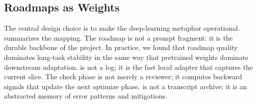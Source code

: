 \begin{table}[t]
\centering
\small
{}
\caption{The eight loop skills share the same persistent state abstraction while adapting to different agent CLIs. \texttt{moa-loop} extends the interface with DAG scheduling and shared blackboard.}
\label{tab:skills}
\end{table}

\subsection{Roadmaps as Weights}

The central design choice is to make the deep-learning metaphor operational.  summarizes the mapping. The roadmap is not a prompt fragment; it is the durable backbone of the project. In practice, we found that roadmap quality dominates long-task stability in the same way that pretrained weights dominate downstream adaptation. \activestate{} is not a log; it is the fast local adapter that captures the current slice. The check phase is not merely a reviewer; it computes backward signals that update the next optimize phase. \failurebank{} is not a transcript archive; it is an abstracted memory of error patterns and mitigations.

